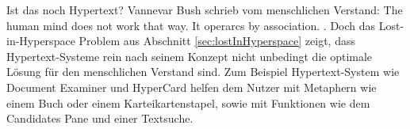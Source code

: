 \begin{section}{Ist das noch Hypertext?}
Vannevar Bush schrieb vom menschlichen Verstand: \glqq The human mind does not work that way. It operarcs by association.\grqq{ }\cite{Bush1945} \cite{Life1945}. Doch das Lost-in-Hyperspace Problem aus Abschnitt \ref{sec:lostInHyperspace} zeigt, dass Hypertext-Systeme rein nach seinem Konzept nicht unbedingt die optimale Lösung für den menschlichen Verstand sind. Zum Beispiel Hypertext-System wie Document Examiner und HyperCard helfen dem Nutzer mit Metaphern wie einem Buch oder einem Karteikartenstapel, sowie mit Funktionen wie dem Candidates Pane und einer Textsuche.

\end{section}